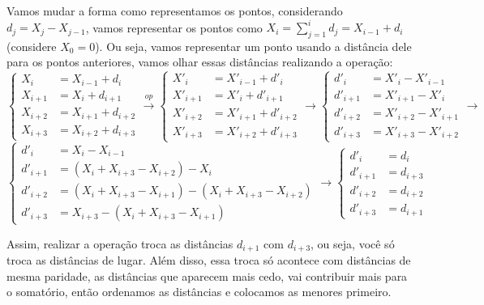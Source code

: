 Vamos mudar a forma como representamos os pontos, considerando $d_j = X_j - X_{j-1}$, vamos representar os pontos como $X_i = \sum_{j=1}^id_j = X_{i-1} + d_i$ (considere $X_0 = 0$). Ou seja, vamos representar um ponto usando a distância dele para os pontos anteriores, vamos olhar essas distâncias realizando a operação:
\[
    \begin{cases}
    X_i &= X_{i-1}+d_i \\
    X_{i+1} &= X_i+d_{i+1} \\
    X_{i+2} &= X_{i+1}+d_{i+2} \\
    X_{i+3} &= X_{i+2}+d_{i+3}  
    \end{cases}
    \xrightarrow{op}
    \begin{cases}
    X'_i     &= X'_{i-1}+d'_i \\
    X'_{i+1} &= X'_i+d'_{i+1} \\
    X'_{i+2} &= X'_{i+1}+d'_{i+2} \\
    X'_{i+3} &= X'_{i+2}+d'_{i+3}
    \end{cases}
    \rightarrow
    \begin{cases}
    d'_i     &= X'_i - X'_{i-1} \\
    d'_{i+1} &= X'_{i+1} - X'_i \\
    d'_{i+2} &= X'_{i+2} - X'_{i+1} \\
    d'_{i+3} &= X'_{i+3} - X'_{i+2}
    \end{cases}
    \rightarrow
\]
\[
    \begin{cases}
    d'_i     &= X_i - X_{i-1} \\
    d'_{i+1} &= (X_i+X_{i+3}-X_{i+2}) - X_i \\
    d'_{i+2} &= (X_i+X_{i+3}-X_{i+1}) - (X_i+X_{i+3}-X_{i+2}) \\
    d'_{i+3} &= X_{i+3} - (X_i+X_{i+3}-X_{i+1})
    \end{cases}
    \rightarrow
    \begin{cases}
    d'_i     &= d_i \\
    d'_{i+1} &= d_{i+3} \\
    d'_{i+2} &= d_{i+2} \\
    d'_{i+3} &= d_{i+1}
    \end{cases}
\]

Assim, realizar a operação troca as distâncias $d_{i+1}$ com $d_{i+3}$, ou seja, você só troca as distâncias de lugar. Além disso, essa troca só acontece com distâncias de mesma paridade, as distâncias que aparecem mais cedo, vai contribuir mais para o somatório, então ordenamos as distâncias e colocamos as menores primeiro.

